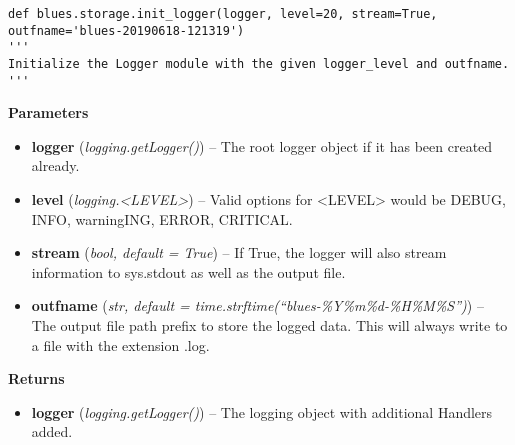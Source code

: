 \begin{description}
\begin{verbatim}
def blues.storage.init_logger(logger, level=20, stream=True, outfname='blues-20190618-121319')
'''
Initialize the Logger module with the given logger_level and outfname.
'''
\end{verbatim}

\begin{description}
\item
    \textbf{Parameters}
\begin{itemize}
\item
  \textbf{logger} (\emph{logging.getLogger()}) -- The root logger object
  if it has been created already.
\item
  \textbf{level} (\emph{logging.\textless LEVEL\textgreater{}}) -- Valid
  options for \textless LEVEL\textgreater{} would be DEBUG, INFO,
  warningING, ERROR, CRITICAL.
\item
  \textbf{stream} (\emph{bool, default = True}) -- If True, the logger
  will also stream information to sys.stdout as well as the output file.
\item
  \textbf{outfname} (\emph{str, default =
  time.strftime(``blues-\%Y\%m\%d-\%H\%M\%S'')}) -- The output file path
  prefix to store the logged data. This will always write to a file with
  the extension .log.
\end{itemize}
\item
    \textbf{Returns}
\begin{itemize}
    \item
        \textbf{logger} (\emph{logging.getLogger()}) -- The logging object with additional Handlers added.
\end{itemize}
\end{description}
\end{description}

